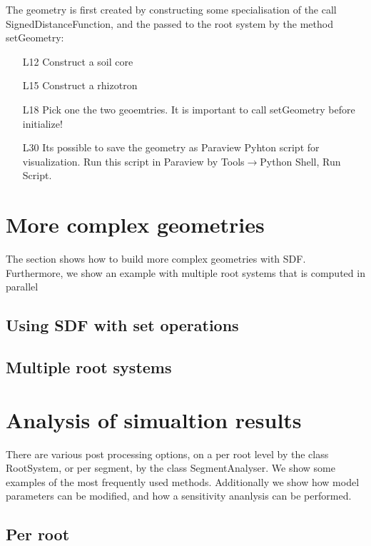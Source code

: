\documentclass[a4paper]{article}
\begin{document}
The geometry is first created by constructing some specialisation of the call SignedDistanceFunction, and the passed to the root system by the method setGeometry: 
\begin{itemize}
 \item[L12] Construct a soil core 
 \item[L15] Construct a rhizotron
 \item[L18] Pick one the two geoemtries. It is important to call setGeometry before initialize!
 \item[L30] Its possible to save the geometry as Paraview Pyhton script for visualization. Run this script in Paraview by Tools$\rightarrow$Python Shell, Run Script.
\end{itemize}




\section{More complex geometries}

The section shows how to build more complex geometries with SDF. 
Furthermore, we show an example with multiple root systems that is computed in parallel

\subsection{Using SDF with set operations}

\subsection{Multiple root systems}



\section{Analysis of simualtion results}

There are various post processing options, on a per root level by the class RootSystem, or per segment, by the class SegmentAnalyser.
We show some examples of the most frequently used methods. Additionally we show how model parameters can be modified, 
and how a sensitivity ananlysis can be performed. 

\subsection{Per root}
\end{document}
